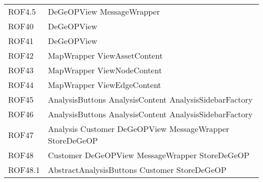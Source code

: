 \begin{longtable}{p{2.5cm}!{\VRule[1pt]}p{5cm}}
		ROF4.5 & DeGeOPView \newline MessageWrapper\\
		ROF40 & DeGeOPView\\
		ROF41 & DeGeOPView\\
		ROF42 & MapWrapper \newline ViewAssetContent\\
		ROF43 & MapWrapper \newline ViewNodeContent\\
		ROF44 & MapWrapper \newline ViewEdgeContent\\
		ROF45 & AnalysisButtons \newline AnalysisContent \newline AnalysisSidebarFactory\\
		ROF46 & AnalysisButtons \newline AnalysisContent \newline AnalysisSidebarFactory\\
		ROF47 & Analysis \newline Customer \newline DeGeOPView \newline MessageWrapper \newline StoreDeGeOP\\
		ROF48 & Customer \newline DeGeOPView \newline MessageWrapper \newline StoreDeGeOP\\
		ROF48.1 & AbstractAnalysisButtons \newline Customer \newline StoreDeGeOP\\

\end{longtable}
